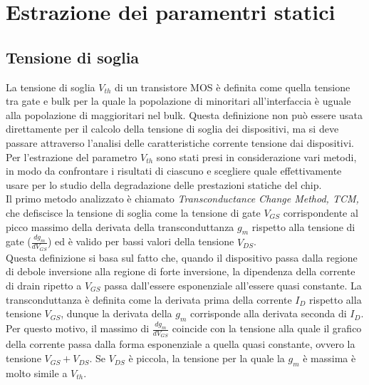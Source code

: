 \documentclass[12pt, letterpaper]{book}
\begin{document}
\chapter{Estrazione dei paramentri statici}

\section{Tensione di soglia}

La tensione di soglia $V_{th}$ di un transistore MOS è definita come quella tensione tra gate e bulk per la quale la popolazione di minoritari all’interfaccia è uguale alla popolazione di maggioritari nel bulk. Questa definizione non può essere usata direttamente per il calcolo della tensione di soglia dei dispositivi, ma si deve passare attraverso l'analisi delle caratteristiche corrente tensione dai dispositivi. \\	
Per l'estrazione del parametro $V_{th}$ sono stati presi in considerazione vari metodi, in modo da confrontare i risultati di ciascuno e scegliere quale effettivamente usare per lo studio della degradazione delle prestazioni statiche del chip.\\

Il primo metodo analizzato è chiamato \emph{Transconductance Change Method, TCM,} che defiscisce la tensione di soglia come la tensione di gate $V_{GS}$ corrispondente al picco massimo della derivata della transconduttanza $g_m$ rispetto alla tensione di gate ($\frac{dg_m}{dV_ {GS}}$) ed è valido per bassi valori della tensione $V_{DS}$.\\
Questa definizione si basa sul fatto che, quando il dispositivo passa dalla regione di debole inversione alla regione di forte inversione, la dipendenza della corrente di drain ripetto a $V_{GS}$ passa dall'essere esponenziale all'essere quasi constante. 
La transconduttanza è definita come la derivata prima della corrente $I_D$ rispetto alla tensione $V_{GS}$, dunque la derivata della $g_m$ corrisponde alla derivata seconda di $I_D$. Per questo motivo, il massimo di $\frac{dg_m}{dV_{GS}}$ coincide con la tensione alla quale il grafico della corrente passa dalla forma esponenziale a quella quasi constante, ovvero la tensione $V_{GS}+V_{DS}$. Se $V_{DS}$ è piccola, la tensione per la quale la $g_m$ è massima è molto simile a $V_{th}$.\\
\end{document}
